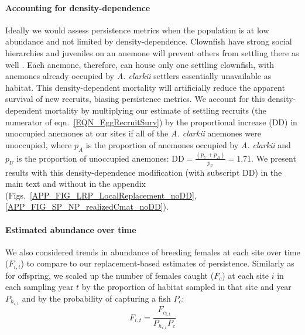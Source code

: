 \documentclass[12pt, oneside]{article}   	%
\begin{document}
\paragraph*{Accounting for density-dependence}  %

Ideally we would assess persistence metrics when the population is at low abundance and not limited by density-dependence. Clownfish have strong social hierarchies and juveniles on an anemone will prevent others from settling there as well \citep[seen in \textit{A. percula,}][]{buston2003forcible}. Each anemone, therefore, can house only one settling clownfish, with anemones already occupied by \textit{A. clarkii} settlers essentially unavailable as habitat. This density-dependent mortality will artificially reduce the apparent survival of new recruits, biasing persistence metrics. We account for this density-dependent mortality by multiplying our estimate of settling recruits (the numerator of eqn.\ \ref{EQN_EggRecruitSurv}) by the proportional increase ($\text{DD}$) in unoccupied anemones at our sites if all of the \textit{A. clarkii} anemones were unoccupied, where $p_A$ is the proportion of anemones occupied by \textit{A. clarkii} and $p_U$ is the proportion of unoccupied anemones: $\text{DD} = \frac{(p_U + p_A)}{p_U} = 1.71$. We present results with this density-dependence modification (with subscript DD) in the main text and without in the appendix (Figs.\ \ref{APP_FIG_LRP_LocalReplacement_noDD}, \ref{APP_FIG_SP_NP_realizedCmat_noDD}).

\paragraph*{Estimated abundance over time}

We also considered trends in abundance of breeding females at each site over time ($F_{i,t}$) to compare to our replacement-based estimates of persistence. Similarly as for offspring, we scaled up the number of females caught ($F_c$) at each site $i$ in each sampling year $t$ by the proportion of habitat sampled in that site and year $P_{h_{i,t}}$ and by the probability of capturing a fish $P_c$:
\begin{equation}
F_{i,t} = \frac{F_{c_{i,t}}}{P_{h_{i,t}}P_c}
\end{equation}
\end{document}
